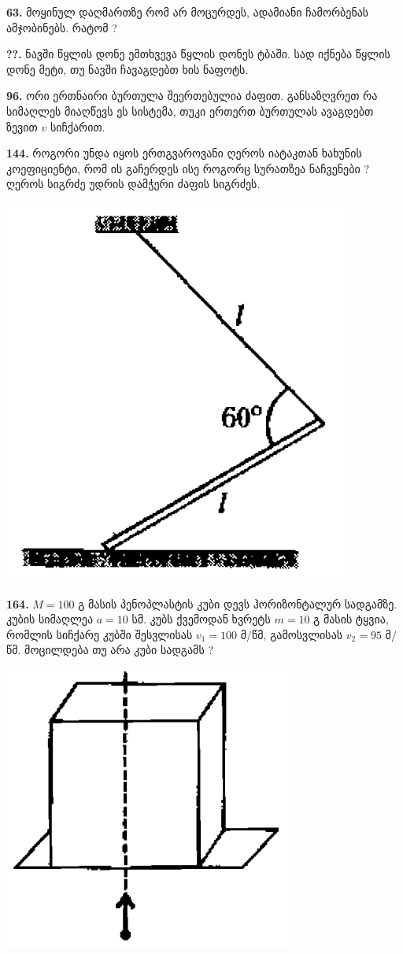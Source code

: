 \documentclass[12pt,a4paper,]{report}
\begin{document}
\textbf{63.} მოყინულ დაღმართზე რომ არ მოცურდეს, ადამიანი ჩამორბენას ამჯობინებს. რატომ ? 
	
\textbf{??.} ნავში წყლის დონე ემთხვევა წყლის დონეს ტბაში. სად იქნება წყლის დონე მეტი, თუ ნავში ჩავაგდებთ ხის ნაფოტს.

\textbf{96.} ორი ერთნაირი ბურთულა შეერთებულია ძაფით. განსაზღვრეთ რა სიმაღლეს მიაღწევს ეს სისტემა, თუკი ერთერთ ბურთულას ავაგდებთ ზევით $v$ სიჩქარით. 

\textbf{144.} როგორი უნდა იყოს ერთგვაროვანი ღეროს იატაკთან ხახუნის კოეფიციენტი, რომ ის გაჩერდეს ისე როგორც სურათზეა ნაჩვენები ? ღეროს სიგრძე უდრის დამჭერი ძაფის სიგრძეს. 
		\begin{center}
			\includegraphics[scale=0.3]{images/144.png}
		\end{center}

\textbf{164.} $M=100$ გ მასის პენოპლასტის კუბი დევს ჰორიზონტალურ სადგამზე. კუბის სიმაღლეა $a=10$ სმ. კუბს ქვემოდან ხვრეტს $m=10$ გ მასის ტყვია, რომლის სიჩქარე კუბში შესვლისას $v_1=100$ მ/წმ, გამოსვლისას $v_2=95$ მ/წმ. მოცილდება თუ არა კუბი სადგამს ? 
		\begin{center}
			\includegraphics[scale=0.4]{images/164.png}
		\end{center}
	
\end{document}
